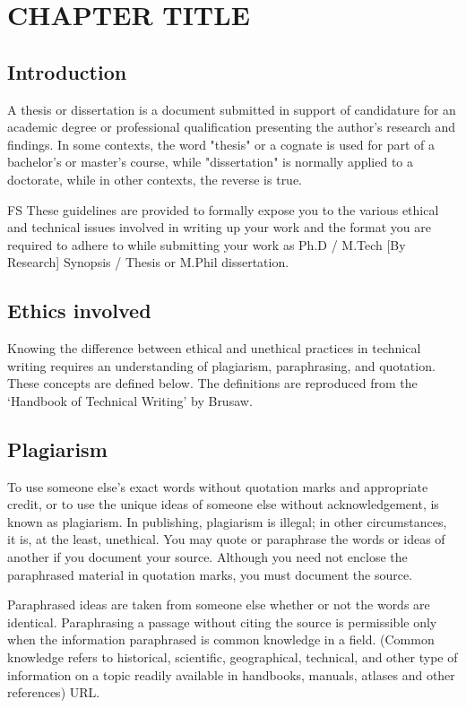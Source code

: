 \chapter{CHAPTER TITLE} \label{c1}
\justifying
\section {Introduction}
A thesis or dissertation is a document submitted in support of candidature for an academic degree or professional qualification presenting the author's research and findings. In some contexts, the word "thesis" or a cognate is used for part of a bachelor's or master's course, while "dissertation" is normally applied to a doctorate, while in other contexts, the reverse is true.

\gls{FS} These guidelines are provided to formally expose you to the various ethical and technical issues involved in writing up your work and the format you are required to adhere to while submitting your work as Ph.D / M.Tech [By Research] Synopsis / Thesis or M.Phil dissertation. 

\section {Ethics involved}

 Knowing the difference between ethical and unethical practices in technical writing requires an understanding of plagiarism, paraphrasing, and quotation. These concepts are defined below. The definitions are reproduced from the `Handbook of Technical Writing' by Brusaw.

\section{Plagiarism}

To use someone else's exact words without quotation marks and appropriate credit, or to use the unique ideas of someone else without acknowledgement, is known as plagiarism. In publishing, plagiarism is illegal; in other circumstances, it is, at the least, unethical. You may quote or paraphrase the words or ideas of another if you document your source. Although you need not enclose the paraphrased material in quotation marks, you must document the source. 


Paraphrased ideas are taken from someone else whether or not the words are identical. Paraphrasing a passage without citing the source is permissible only when the information paraphrased is common knowledge in a field. (Common knowledge refers to historical, scientific, geographical, technical, and other type of information on a topic readily available in handbooks, manuals, atlases and other references) \gls{URL}. 

